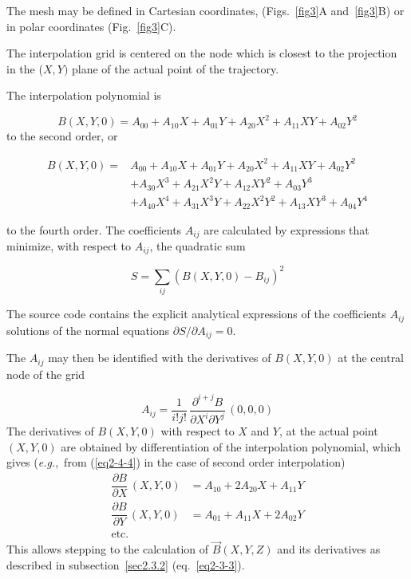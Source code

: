 \noindent The mesh may be defined in Cartesian coordinates, 
(Figs.~\ref{fig3}A and~\ref{fig3}B) or in polar coordinates (Fig.~\ref{fig3}C).   

\noindent The interpolation grid is centered on the node which is closest to
the projection in  the ($ X,Y) $ plane of the actual point of the trajectory. 

\noindent The interpolation polynomial is 

 \begin{equation}
	 B(X,Y,0) = A_{00} + A_{10}X + A_{01}Y + A_{20}X^2 + A_{11}XY + A_{02}Y^2
 	\label{eq2-4-4}
 \end{equation}
 to the second order, or 

 \begin{equation}
	 \begin{aligned}
		 B(X,Y,0)  = 
		    & A_{00}+A_{10}X+A_{01}Y + A_{20}X^2 + A_{11}XY + A_{02}Y^2 \\
		    & +  A_{30}X^3+A_{21}X^2Y + A_{12}XY^2 + A_{03}Y^3 \\
		    & +  A_{40}X^4 + A_{31}X^3Y + A_{22}X^2Y^2 +A_{13}XY^3 + A_{04}Y^4 
	 \end{aligned}
 	\label{eq2-4-5}
 \end{equation}

to the  fourth order.  The coefficients $ A_{ij} $ are calculated by
expressions that 
minimize, with respect to $ A_{ij}$, the quadratic sum 

\begin{equation}
	S = \sum_{ij}(B(X,Y,0)-B_{ij})^2 
	\label{eq2-4-5b} %
\end{equation}

The source code contains the explicit analytical 
expressions of the coefficients $A_{ij}$ solutions of the normal 
equations $\partial S / \partial A_{ij} = 0$.

\noindent The $ A_{ij} $ may then be identified with  the derivatives of 
$B(X,Y,0) $ at the central node of the grid 

\begin{equation}
	A_{ij} = \dfrac{1 }{ i!j!}\, \dfrac{\partial^{ i+j}B }{ \partial X^i\partial Y^j} \,(0,0,0) 
	\label{eq2-4-6}
\end{equation}
%
\noindent The derivatives of $ B(X,Y,0) $ with respect to $ X $ and $ Y$, at
the actual point 
$ (X,Y,0) $ are obtained by differentiation of the interpolation polynomial, 
which gives (\emph{e.g.},~from (\ref{eq2-4-4}) in the case of second order interpolation)
%
\begin{equation}
	\begin{aligned}
		\dfrac{ \partial B }{ \partial X} \,(X,Y,0)  
		   & =   A_{10}+2A_{20}X+A_{11}Y \\
		 \dfrac{\partial B }{ \partial Y}\, (X,Y,0) 
		   & =  A_{01}+A_{11}X+2A_{02}Y \\
		\text{etc.} 
	\end{aligned}
	\label{eq2-4-7}
\end{equation}
%
This allows stepping to the calculation of $ \vec  B(X,Y,Z) $ and its derivatives
as described in subsection~\ref{sec2.3.2} (eq.~\ref{eq2-3-3}).

